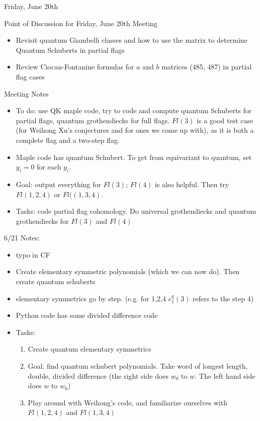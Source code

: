 Friday, June 20th

Point of Discussion for Friday, June 20th Meeting
\begin{itemize}
    \item Revisit quantum Giambelli classes and how to use the matrix to determine Quantum Schuberts in partial flags
    \item Review Ciocan-Fontanine formulas for $a$ and $b$ matrices (485, 487) in partial flag cases
\end{itemize}


Meeting Notes
\begin{itemize}
    \item To do: use QK maple code, try to code and compute quantum Schuberts for partial flags, quantum grothendiecks for full flags. $Fl(3)$ is a good test case (for Weihong Xu's conjectures and for ones we come up with), as it is both a complete flag and a two-step flag. 
    \item Maple code has quantum Schubert. To get from equivariant to quantum, set $y_i = 0$ for each $y_i$.
    \item Goal: output everything for $Fl(3)$; $Fl(4)$ is also helpful. Then try $Fl(1,2,4)$ or $Fl((1,3,4)$.
    \item Tasks: code partial flag cohomology. Do universal grothendiecks and quantum grothendiecks for $Fl(3)$ and $Fl(4)$
\end{itemize}

6/21 Notes:
\begin{itemize}
    \item typo in CF
    \item Create elementary symmetric polynomials (which we can now do). Then create quantum schuberts
    \item elementary symmetrics go by step. (e.g. for 1,2,4 $e_1^q(3)$ refers to the step 4)
    \item Python code has some divided difference code
    \item Tasks:
    \begin{enumerate}
        \item Create quantum elementary symmetrics
        \item Goal: find quantum schubert polynomials. Take word of longest length, double, divided difference (the right side does $w_0$ to $w$. The left hand side does $w$ to $w_0$) 
        \item Play around with Weihong's code, and familiarize ourselves with $Fl(1,2,4)$ and $Fl(1,3,4)$
    \end{enumerate}
\end{itemize}